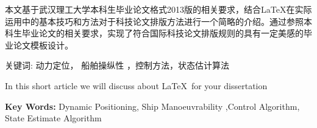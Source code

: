 本文基于武汉理工大学本科生毕业论文格式2013版的相关要求，结合\LaTeX 在实际运用中的基本技巧和方法对于科技论文排版方法进行一个简略的介绍。通过参照本科生毕业论文的相关要求，实现了符合国际科技论文排版规则的具有一定美感的毕业论文模板设计。

{\heiti 关键词:}  \songti 动力定位， 船舶操纵性 ，控制方法，状态估计算法

In this short article we will discuss about \LaTeX\,  for your dissertation

\textbf{Key Words:} Dynamic Positioning, Ship Manoeuvrability ,Control Algorithm, State Estimate Algorithm


